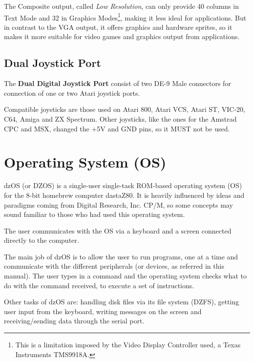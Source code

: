 \documentclass[a4paper,11pt]{article}
\begin{document}
    The Composite output, called \textit{Low Resolution}, can only provide 40
    columns in Text Mode and 32 in Graphics Modes\footnote{This is a limitation
    imposed by the Video Display Controller used, a Texas Instruments TMS9918A.},
    making it less ideal for applications. But in contrast to the VGA output, it
    offers graphics and hardware sprites, so it makes it more suitable for video
    games and graphics output from applications.

    \subsection{Dual Joystick Port}
    The \textbf{Dual Digital Joystick Port} consist of two DE-9 Male connectors
    for connection of one or two Atari joystick ports.

    Compatible joysticks are those used on Atari 800, Atari VCS, Atari ST,
    VIC-20, C64, Amiga and ZX Spectrum. Other joysticks, like the ones for the
    Amstrad CPC and MSX, changed the +5V and GND pins, so it MUST not be used.

    \pagebreak
    \section{Operating System (OS)}
    dzOS (or DZOS) is a single-user single-task ROM-based operating system (OS)
    for the 8-bit homebrew computer dastaZ80. It is heavily influenced by ideas
    and paradigms coming from Digital Research, Inc. CP/M, so some concepts may
    sound familiar to those who had used this operating system.

    The user communicates with the OS via a keyboard and a screen connected
    directly to the computer.

    The main job of dzOS is to allow the user to run programs, one at a time and
    communicate with the different peripherals (or devices, as referred in this
    manual). The user types in a command and the operating system checks what to
    do with the command received, to execute a set of instructions.

    Other tasks of dzOS are: handling disk files via its file system (DZFS),
    getting user input from the keyboard, writing messages on the screen and
    receiving/sending data through the serial port.
\end{document}
